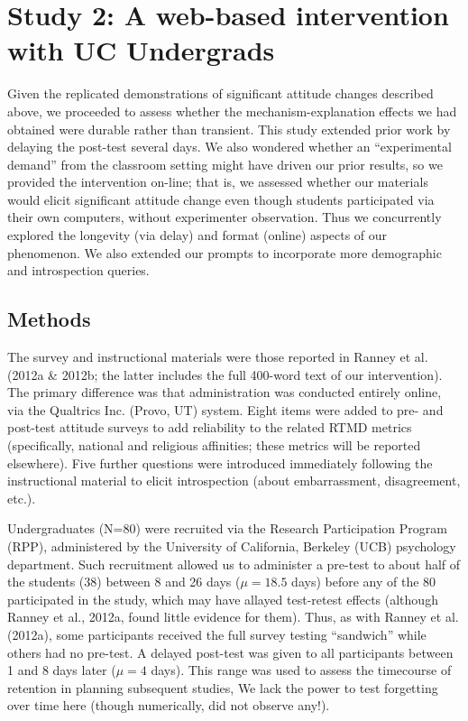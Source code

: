 \section{Study 2: A web-based intervention with UC Undergrads}

Given the replicated demonstrations of significant attitude changes described
above, we proceeded to assess whether the mechanism-explanation effects we had
obtained were durable rather than transient. This study extended prior work by
delaying the post-test several days. We also wondered whether an ``experimental
demand'' from the classroom setting might have driven our prior results, so we
provided the intervention on-line; that is, we assessed whether our materials
would elicit significant attitude change even though students participated via
their own computers, without experimenter observation. Thus we concurrently
explored the longevity (via delay) and format (online) aspects of our
phenomenon. We also extended our prompts to incorporate more demographic and
introspection queries.

\subsection{Methods}

The survey and instructional materials were those reported in Ranney et al.
(2012a \& 2012b; the latter includes the full 400-word text of our
intervention). The primary difference was that administration was conducted
entirely online, via the Qualtrics Inc. (Provo, UT) system. Eight items were
added to pre- and post-test attitude surveys to add reliability to the related
RTMD metrics (specifically, national and religious affinities; these metrics
will be reported elsewhere). Five further questions were introduced immediately
following the instructional material to elicit introspection (about
embarrassment, disagreement, etc.).  

Undergraduates (N=80) were recruited via the Research Participation Program
(RPP), administered by the University of California, Berkeley (UCB) psychology
department. Such recruitment allowed us to administer a pre-test to about half
of the students (38) between 8 and 26 days ($\mu=18.5$ days) before any of the
80 participated in the study, which may have allayed test-retest effects
(although Ranney et al., 2012a, found little evidence for them). Thus, as with
Ranney et al. (2012a), some participants received the full survey testing
``sandwich'' while others had no pre-test. A delayed post-test was given to all
participants between 1 and 8 days later ($\mu=4$ days). This range was used to
assess the timecourse of retention in planning subsequent studies, We lack the
power to test forgetting over time here (though numerically, did not observe
any!).

